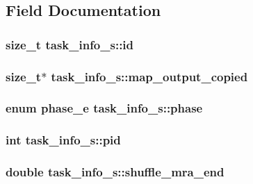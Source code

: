 \subsection{\-Field \-Documentation}
\hypertarget{structtask__info__s_a4974ced5dfb8d5d2ab72351cc12e1bb6}{
\subsubsection[{id}]{\setlength{\rightskip}{0pt plus 5cm}size\-\_\-t {\bf task\-\_\-info\-\_\-s\-::id}}}\label{structtask__info__s_a4974ced5dfb8d5d2ab72351cc12e1bb6}
\hypertarget{structtask__info__s_a89d391613219da550d84283a89461bf4}{
\subsubsection[{map\-\_\-output\-\_\-copied}]{\setlength{\rightskip}{0pt plus 5cm}size\-\_\-t$\ast$ {\bf task\-\_\-info\-\_\-s\-::map\-\_\-output\-\_\-copied}}}\label{structtask__info__s_a89d391613219da550d84283a89461bf4}
\hypertarget{structtask__info__s_afa72d514e04545e1916981f970178902}{
\subsubsection[{phase}]{\setlength{\rightskip}{0pt plus 5cm}enum {\bf phase\-\_\-e} {\bf task\-\_\-info\-\_\-s\-::phase}}}\label{structtask__info__s_afa72d514e04545e1916981f970178902}
\hypertarget{structtask__info__s_abf5e8401c80afb200b761ed7207cfcea}{
\subsubsection[{pid}]{\setlength{\rightskip}{0pt plus 5cm}int {\bf task\-\_\-info\-\_\-s\-::pid}}}\label{structtask__info__s_abf5e8401c80afb200b761ed7207cfcea}
\hypertarget{structtask__info__s_a3f07b243958c81aab30d87f2f8aa63c3}{
\subsubsection[{shuffle\-\_\-mra\-\_\-end}]{\setlength{\rightskip}{0pt plus 5cm}double {\bf task\-\_\-info\-\_\-s\-::shuffle\-\_\-mra\-\_\-end}}}\label{structtask__info__s_a3f07b243958c81aab30d87f2f8aa63c3}
